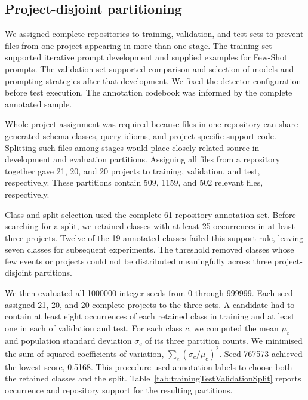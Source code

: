 \subsection{Project-disjoint partitioning}\label{sec:dataSplit}

We assigned complete repositories to training, validation, and test sets to prevent files from one project appearing in more than one stage. The training set supported iterative prompt development and supplied examples for Few-Shot prompts. The validation set supported comparison and selection of models and prompting strategies after that development. We fixed the detector configuration before test execution. The annotation codebook was informed by the complete annotated sample.

Whole-project assignment was required because files in one repository can share generated schema classes, query idioms, and project-specific support code. Splitting such files among stages would place closely related source in development and evaluation partitions. Assigning all files from a repository together gave \num{21}, \num{20}, and \num{20} projects to training, validation, and test, respectively. These partitions contain \num{509}, \num{1159}, and \num{502} relevant files, respectively.

Class and split selection used the complete \num{61}-repository annotation set. Before searching for a split, we retained classes with at least \num{25} occurrences in at least three projects. Twelve of the 19 annotated classes failed this support rule, leaving seven classes for subsequent experiments. The threshold removed classes whose few events or projects could not be distributed meaningfully across three project-disjoint partitions.

We then evaluated all \num{1000000} integer seeds from \num{0} through \num{999999}. Each seed assigned \num{21}, \num{20}, and \num{20} complete projects to the three sets. A candidate had to contain at least eight occurrences of each retained class in training and at least one in each of validation and test. For each class $c$, we computed the mean $\mu_c$ and population standard deviation $\sigma_c$ of its three partition counts. We minimised the sum of squared coefficients of variation, $\sum_c (\sigma_c/\mu_c)^2$. Seed \num{767573} achieved the lowest score, \num{0.5168}. This procedure used annotation labels to choose both the retained classes and the split. Table~\ref{tab:trainingTestValidationSplit} reports occurrence and repository support for the resulting partitions.


